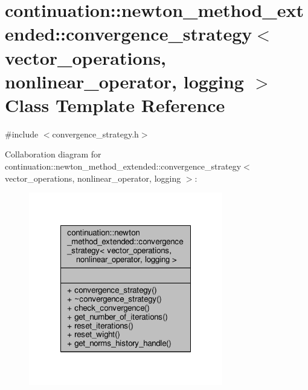 \hypertarget{classcontinuation_1_1newton__method__extended_1_1convergence__strategy}{\section{continuation\-:\-:newton\-\_\-method\-\_\-extended\-:\-:convergence\-\_\-strategy$<$ vector\-\_\-operations, nonlinear\-\_\-operator, logging $>$ Class Template Reference}
\label{classcontinuation_1_1newton__method__extended_1_1convergence__strategy}
}


{\ttfamily \#include $<$convergence\-\_\-strategy.\-h$>$}



Collaboration diagram for continuation\-:\-:newton\-\_\-method\-\_\-extended\-:\-:convergence\-\_\-strategy$<$ vector\-\_\-operations, nonlinear\-\_\-operator, logging $>$\-:\nopagebreak
\begin{figure}[H]
\begin{center}
\leavevmode
\includegraphics[width=240pt]{classcontinuation_1_1newton__method__extended_1_1convergence__strategy__coll__graph}
\end{center}
\end{figure}
